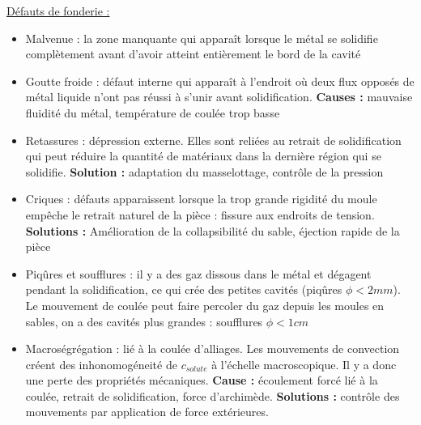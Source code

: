 \documentclass[../main.tex]{subfiles}
\begin{document}
\quad \underline{Défauts de fonderie :}\\
\begin{itemize}
    \item Malvenue : la zone manquante qui apparaît lorsque le métal se solidifie complètement avant d'avoir atteint entièrement le bord de la cavité\\
    \item Goutte froide : défaut interne qui apparaît à l'endroit où deux flux opposés de métal liquide n'ont pas réussi à s'unir avant solidification. \textbf{Causes :} mauvaise fluidité du métal, température de coulée trop basse\\
    \item Retassures : dépression externe. Elles sont reliées au retrait de solidification qui peut réduire la quantité de matériaux dans la dernière région qui se solidifie. \textbf{Solution :} adaptation du masselottage, contrôle de la pression\\
    \item Criques : défauts apparaissent lorsque la trop grande rigidité du moule empêche le retrait naturel de la pièce : fissure aux endroits de tension. \textbf{Solutions : } Amélioration de la collapsibilité du sable, éjection rapide de la pièce\\
    \item Piqûres et soufflures : il y a des gaz dissous dans le métal et dégagent pendant la solidification, ce qui crée des petites cavités (piqûres $\phi<2mm$). Le mouvement de coulée peut faire percoler du gaz depuis les moules en sables, on a des cavités plus grandes : soufflures $\phi<1cm$\\
    \item Macroségrégation : lié à la coulée d'alliages. Les mouvements de convection créent des inhonomogéneité de $c_{solute}$ à l'échelle macroscopique. Il y a donc une perte des propriétés mécaniques. \textbf{Cause :} écoulement forcé lié à la coulée, retrait de solidification, force d'archimède. \textbf{Solutions :} contrôle des mouvements par application de force extérieures.\\
\end{itemize}
\end{document}
